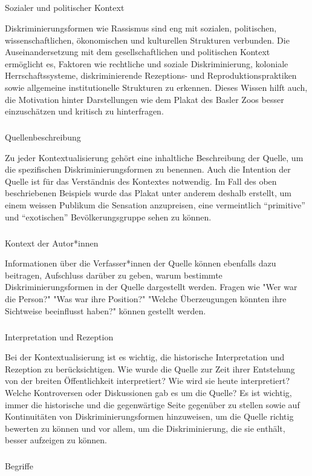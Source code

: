 \documentclass[
  letterpaper,
  DIV=11,
  numbers=noendperiod]{scrartcl}
\makeatletter
\let\oldsubparagraph\subparagraph
\renewcommand{\subparagraph}{
    \@ifstar
      \xxxSubParagraphStar
      \xxxSubParagraphNoStar
  }
\newcommand{\xxxSubParagraphStar}[1]{\oldsubparagraph*{#1}\mbox{}}
\newcommand{\xxxSubParagraphNoStar}[1]{\oldsubparagraph{#1}\mbox{}}
\makeatother
\begin{document}
\subparagraph{Sozialer und politischer
Kontext}\label{sozialer-und-politischer-kontext}

Diskriminierungsformen wie Rassismus sind eng mit sozialen, politischen,
wissenschaftlichen, ökonomischen und kulturellen Strukturen verbunden.
Die Auseinandersetzung mit dem gesellschaftlichen und politischen
Kontext ermöglicht es, Faktoren wie rechtliche und soziale
Diskriminierung, koloniale Herrschaftssysteme, diskriminierende
Rezeptions- und Reproduktionspraktiken sowie allgemeine institutionelle
Strukturen zu erkennen. Dieses Wissen hilft auch, die Motivation hinter
Darstellungen wie dem Plakat des Basler Zoos besser einzuschätzen und
kritisch zu hinterfragen.

\subparagraph{Quellenbeschreibung}\label{quellenbeschreibung}

Zu jeder Kontextualisierung gehört eine inhaltliche Beschreibung der
Quelle, um die spezifischen Diskriminierungsformen zu benennen. Auch die
Intention der Quelle ist für das Verständnis des Kontextes notwendig. Im
Fall des oben beschriebenen Beispiels wurde das Plakat unter anderem
deshalb erstellt, um einem weissen Publikum die Sensation anzupreisen,
eine vermeintlich ``primitive'' und ``exotischen'' Bevölkerungsgruppe
sehen zu können.

\subparagraph{Kontext der Autor*innen}\label{kontext-der-autorinnen}

Informationen über die Verfasser*innen der Quelle können ebenfalls dazu
beitragen, Aufschluss darüber zu geben, warum bestimmte
Diskriminierungsformen in der Quelle dargestellt werden. Fragen wie "Wer
war die Person?" "Was war ihre Position?" "Welche Überzeugungen könnten
ihre Sichtweise beeinflusst haben?" können gestellt werden.

\subparagraph{Interpretation und
Rezeption}\label{interpretation-und-rezeption}

Bei der Kontextualisierung ist es wichtig, die historische
Interpretation und Rezeption zu berücksichtigen. Wie wurde die Quelle
zur Zeit ihrer Entstehung von der breiten Öffentlichkeit interpretiert?
Wie wird sie heute interpretiert? Welche Kontroversen oder Diskussionen
gab es um die Quelle? Es ist wichtig, immer die historische und die
gegenwärtige Seite gegenüber zu stellen sowie auf Kontinuitäten von
Diskriminierungsformen hinzuweisen, um die Quelle richtig bewerten zu
können und vor allem, um die Diskriminierung, die sie enthält, besser
aufzeigen zu können.

\subparagraph{Begriffe}\label{begriffe}
\end{document}
